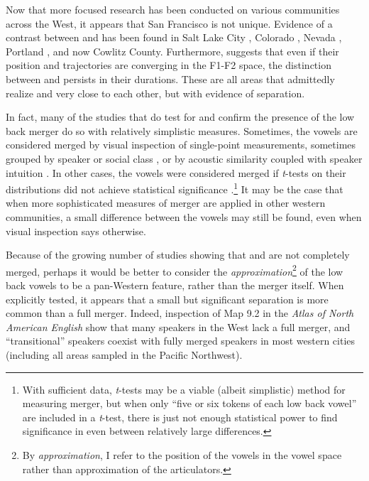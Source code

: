 Now that more focused research has been conducted on various communities across the West, it appears that San Francisco is not unique. Evidence of a contrast between \lot and \thought has been found in Salt Lake City \citep{dipaolo_1992}, Colorado \citep{holland_brandenburg_2017_pads}, Nevada \citep{fridland_kendall_2017_pads}, Portland \citep{becker_etal_2016_pads}, and now Cowlitz County. Furthermore, \citet{brickhouse_2019} suggests that even if their position and trajectories are converging in the F1-F2 space, the distinction between \lot and \thought persists in their durations. These are all areas that admittedly realize \lot and \thought very close to each other, but with evidence of separation.

In fact, many of the studies that do test for and confirm the presence of the low back merger do so with relatively simplistic measures. Sometimes, the vowels are considered merged by visual inspection of single-point measurements, sometimes grouped by speaker or social class \citep{brumbaugh_koops_2017_pads, kennedy_grama_2012, wassink_2015}, or by acoustic similarity coupled with speaker intuition \citep[59]{labov_ash_boberg_2006_anae}. In other cases, the vowels were considered merged if \textit{t}-tests on their distributions did not achieve statistical significance \citep{bar_el_etal_2017}.\footnote{With sufficient data, \textit{t}-tests may be a viable (albeit simplistic) method for measuring merger, but when only ``five or six tokens of each low back vowel'' \citep[122]{bar_el_etal_2017} are included in a \textit{t}-test, there is just not enough statistical power to find significance in even between relatively large differences.} It may be the case that when more sophisticated measures of merger are applied in other western communities, a small difference between the vowels may still be found, even when visual inspection says otherwise.

Because of the growing number of studies showing that \lot and \thought are not completely merged, perhaps it would be better to consider the \textit{approximation}\footnote{By \textit{approximation}, I refer to the position of the vowels in the vowel space rather than approximation of the articulators.} of the low back vowels to be a pan-Western feature, rather than the merger itself. When explicitly tested, it appears that a small but significant separation is more common than a full merger. Indeed, inspection of Map 9.2 in the \textit{Atlas of North American English} show that many speakers in the West lack a full merger, and ``transitional'' speakers coexist with fully merged speakers in most western cities (including all areas sampled in the Pacific Northwest).

